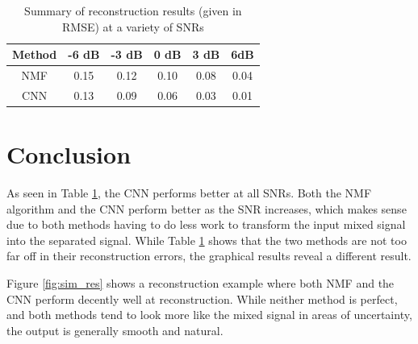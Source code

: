 \documentclass[12pt,chapterheads]{ucsd}
\begin{document}
\vspace{0.25in}
\begin{table}[!ht]
\caption{Summary of reconstruction results (given in RMSE) at a variety of SNRs}

\vspace{-0.25in}
\begin{center}
\begin{tabular}{| c | c | c |  c | c | c |}

\hline
Method & -6 dB & -3 dB & 0 dB & 3 dB & 6dB \\

\hline
NMF & 0.15 & 0.12 & 0.10 & 0.08 & 0.04 \\

\hline
CNN & 0.13 & 0.09 & 0.06 & 0.03 & 0.01 \\

\hline
\end{tabular}
\end{center}
\label{table:results}
\end{table}


\section{Conclusion}
As seen in Table \ref{table:results}, the CNN performs better at all SNRs. Both the NMF algorithm and the CNN perform better as the SNR increases, which makes sense due to both methods having to do less work to transform the input mixed signal into the separated signal. While Table \ref{table:results} shows that the two methods are not too far off in their reconstruction errors, the graphical results reveal a different result.

Figure \ref{fig:sim_res} shows a reconstruction example where both NMF and the CNN perform decently well at reconstruction. While neither method is perfect, and both methods tend to look more like the mixed signal in areas of uncertainty, the output is generally smooth and natural.
\end{document}
